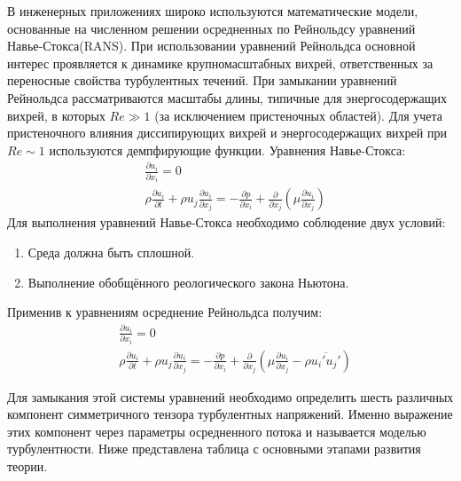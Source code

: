 	В инженерных приложениях широко используются математические модели, основанные на численном решении осредненных по Рейнольдсу уравнений Навье-Стокса(RANS). При использовании уравнений Рейнольдса основной интерес проявляется к динамике крупномасштабных вихрей, ответственных за переносные свойства турбулентных течений. При замыкании уравнений Рейнольдса рассматриваются масштабы длины, типичные для энергосодержащих вихрей, в которых $Re\gg1$ (за исключением пристеночных областей). Для учета пристеночного влияния диссипирующих вихрей и энергосодержащих вихрей при $Re\sim1$ используются демпфирующие функции.
	Уравнения Навье-Стокса:
	\begin{align}
		&\frac{\partial u_i}{\partial x_i} = 0 \nonumber\\
		&\rho\frac{\partial u_i}{\partial t} + \rho u_j \frac{\partial u_i}{\partial x_j} = - \frac{\partial p}{\partial x_i} + \frac{\partial}{\partial x_j}(\mu\frac{\partial u_i}{\partial x_j})
	\end{align}
	Для выполнения уравнений Навье-Стокса необходимо соблюдение двух условий:
	\begin{enumerate}
		\item Среда должна быть сплошной.
		\item Выполнение обобщённого реологического закона Ньютона.
	\end{enumerate}
	Применив к уравнениям осреднение Рейнольдса получим:
	\begin{align}
				&\frac{\partial u_i}{\partial x_i} = 0 \nonumber\\
				&\rho\frac{\partial u_i}{\partial t} + \rho u_j \frac{\partial u_i}{\partial x_j} = - \frac{\partial p}{\partial x_i} + \frac{\partial}{\partial x_j}(\mu\frac{\partial u_i}{\partial x_j} - \rho\overline{u_i' u_j'})
	\end{align}
	
	Для замыкания этой системы уравнений необходимо определить шесть различных компонент симметричного тензора турбулентных напряжений. Именно выражение этих компонент через параметры осредненного потока и называется моделью турбулентности. Ниже представлена таблица с основными этапами развития теории.
	
